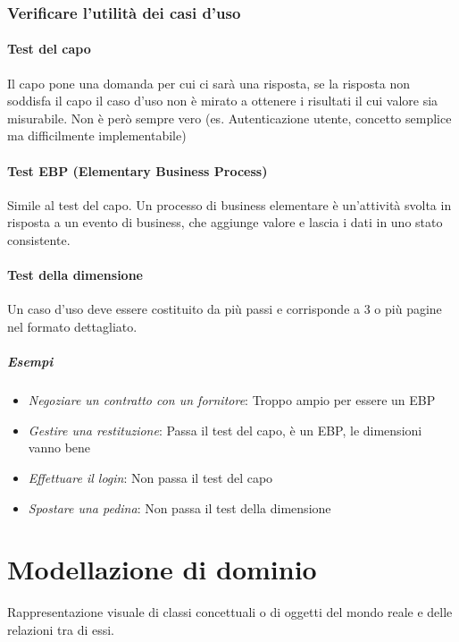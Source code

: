 \documentclass[12pt]{article}
\begin{document}
\subsubsection{Verificare l'utilità dei casi d'uso}
\paragraph{Test del capo} Il capo pone una domanda per cui ci sarà una risposta, se la risposta non soddisfa il capo il caso d'uso non è mirato a ottenere i risultati il cui valore sia misurabile. Non è però sempre vero (es. Autenticazione utente, concetto semplice ma difficilmente implementabile)
\paragraph{Test EBP (Elementary Business Process)} Simile al test del capo. Un processo di business elementare è un'attività svolta in risposta a un evento di business, che aggiunge valore e lascia i dati in uno stato consistente.
\paragraph{Test della dimensione} Un caso d'uso deve essere costituito da più passi e corrisponde a 3 o più pagine nel formato dettagliato.
\subparagraph{Esempi}
\begin{itemize}
    \item \textit{Negoziare un contratto con un fornitore}: Troppo ampio per essere un EBP
    \item \textit{Gestire una restituzione}: Passa il test del capo, è un EBP, le dimensioni vanno bene
    \item \textit{Effettuare il login}: Non passa il test del capo
    \item \textit{Spostare una pedina}: Non passa il test della dimensione
\end{itemize} 
\newpage
\section{Modellazione di dominio}
Rappresentazione visuale di classi concettuali o di oggetti del mondo reale e delle relazioni tra di essi.
\end{document}
